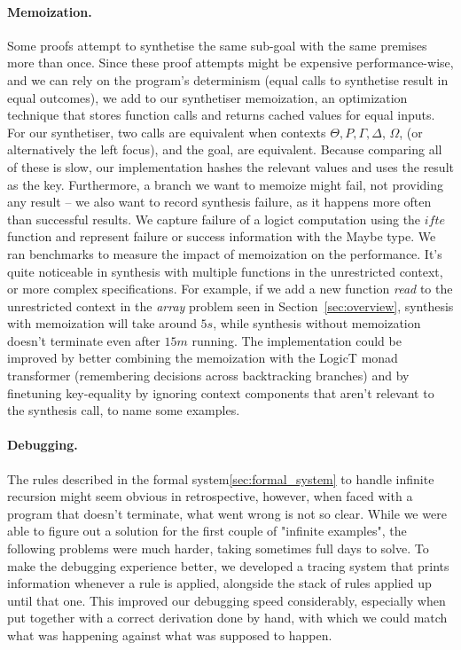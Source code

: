\documentclass{llncs}
\newcommand{\mypara}[1]{\paragraph{\textbf{#1}.}}
\def\Rho{P}
\begin{document}
\mypara{Memoization} Some proofs attempt to synthetise the same sub-goal with
the same premises more than once. Since these proof attempts might be expensive
performance-wise, and we can rely on the program's determinism (equal calls to
synthetise result in equal outcomes), we add to our synthetiser memoization, an
optimization technique that stores function calls and returns cached values for
equal inputs. For our synthetiser, two calls are equivalent when contexts
$\Theta, \Rho, \Gamma, \Delta$, $\Omega$, (or alternatively the left focus), and
the goal, are equivalent. Because comparing all of these is slow, our
implementation hashes the relevant values and uses the result as the key.
Furthermore, a branch we want to memoize might fail, not providing any result --
we also want to record synthesis failure, as it happens more often than
successful results. We capture failure of a logict computation using the $ifte$
function and represent failure or success information with the Maybe type. We
ran benchmarks to measure the impact of memoization on the performance. It's
quite noticeable in synthesis with multiple functions in the unrestricted
context, or more complex specifications. For example, if we add a new function
\emph{read} to the unrestricted context in the \emph{array} problem seen in
Section~\ref{sec:overview}, synthesis with memoization will take around
$5s$, while synthesis without memoization doesn't terminate even after
$15m$ running.
%
The implementation could be improved by better combining the
memoization with the LogicT monad transformer (remembering decisions across
backtracking branches) and by finetuning key-equality by ignoring context
components that aren't relevant to the synthesis call, to name some examples.



\mypara{Debugging} The rules described in the formal
system\ref{sec:formal_system} to handle infinite recursion might seem obvious in
retrospective, however, when faced with a program that doesn't terminate, what
went wrong is not so clear. While we were able to figure out a solution for the
first couple of "infinite examples", the following problems were much harder,
taking sometimes full days to solve. To make the debugging experience better, we
developed a tracing system that prints information whenever a rule is applied,
alongside the stack of rules applied up until that one. This improved our
debugging speed considerably, especially when put together with a correct
derivation done by hand, with which we could match what was happening against
what was supposed to happen.
\end{document}

